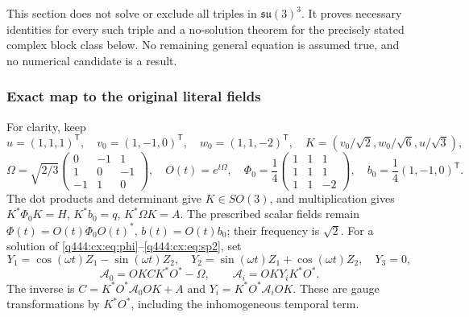 This section does not solve or exclude all triples in $\mathfrak{su}(3)^3$.
It proves necessary identities for every such triple and a no-solution
theorem for the precisely stated complex block class below. No remaining
general equation is assumed true, and no numerical candidate is a result.

\subsubsection*{Exact map to the original literal fields}
For clarity, keep
\[
 u=(1,1,1)^{\mathsf T},\quad v_0=(1,-1,0)^{\mathsf T},\quad
 w_0=(1,1,-2)^{\mathsf T},\quad
 K=\left(v_0/\sqrt2,w_0/\sqrt6,u/\sqrt3\right),
\]
\[
 \Omega=\sqrt{2/3}\begin{pmatrix}0&-1&1\\1&0&-1\\-1&1&0\end{pmatrix},
 \quad O(t)=e^{t\Omega},\quad
 \Phi_0=\frac14\begin{pmatrix}1&1&1\\1&1&1\\1&1&-2\end{pmatrix},
 \quad b_0=\frac14(1,-1,0)^{\mathsf T}.
\]
The dot products and determinant give $K\in SO(3)$, and multiplication
gives $K^*\Phi_0K=H$, $K^*b_0=q$, $K^*\Omega K=A$.
The prescribed scalar fields remain
$\Phi(t)=O(t)\Phi_0O(t)^*$, $b(t)=O(t)b_0$; their frequency is $\sqrt2$.
For a solution of \eqref{q444:cx:eq:phi}--\eqref{q444:cx:eq:sp2}, set
\[
 Y_1=\cos(\omega t)Z_1-\sin(\omega t)Z_2,\quad
 Y_2=\sin(\omega t)Z_1+\cos(\omega t)Z_2,\quad Y_3=0,
\]
\begin{equation}\label{q444:cx:eq:original-inverse}
 \mathcal A_0=OKCK^*O^*-\Omega,\qquad
 \mathcal A_i=OKY_iK^*O^*.
\end{equation}
The inverse is $C=K^*O^*\mathcal A_0OK+A$ and
$Y_i=K^*O^*\mathcal A_iOK$. These are gauge transformations by
$K^*O^*$, including the inhomogeneous temporal term.

